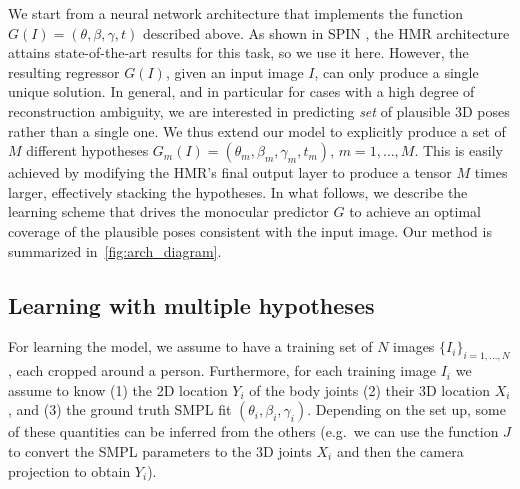
We start from a neural network architecture that implements the function  $G(I) = (\theta, \beta, \gamma, t)$ described above.
As shown in SPIN \cite{kolotouros19learning}, the HMR \cite{kanazawa18learning} architecture attains state-of-the-art results for this task, so we use it here.
However, the resulting regressor $G(I)$, given an input image $I$, can only produce a single unique solution.
In general, and in particular for cases with a high degree of reconstruction ambiguity, we are interested in predicting  \emph{set} of plausible 3D poses rather than a single one.
%
We thus extend our model to explicitly produce a set of $M$ different hypotheses $G_m (I) = (\theta_m, \beta_m, \gamma_m, t_m)$, $m=1,\dots,M$.
This is easily achieved by modifying the HMR's final output layer to produce a tensor $M$ times larger, effectively stacking the hypotheses.
In what follows, we describe the learning scheme that drives the monocular predictor $G$ to achieve
an optimal coverage of the plausible poses consistent with the input image. Our method is summarized in~\cref{fig:arch_diagram}. 

\subsection{Learning with multiple hypotheses}

For learning the model, we assume to have a training set of $N$ images $\{I_i\}_{i =1,\dots,N}$, each cropped around a person.
Furthermore, for each training image $I_i$ we assume to know (1) the 2D location $Y_i$ of the body joints (2) their 3D location $X_i$, and (3) the ground truth SMPL fit $(\theta_i, \beta_i, \gamma_i)$.
Depending on the set up, some of these quantities can be inferred from the others (e.g.~we can use the function $J$ to convert the SMPL parameters to the 3D joints $X_i$ and then the camera projection to obtain $Y_i$).

